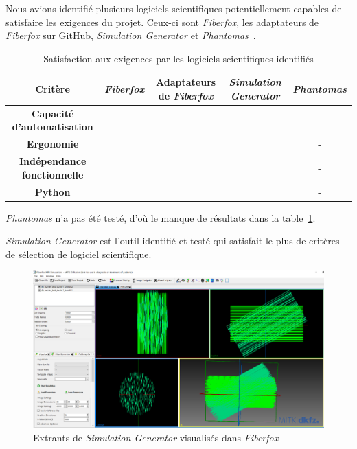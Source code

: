 \documentclass{article}
\newcommand{\cmark}{\ding{51}} %
\newcommand{\xmark}{\ding{55}} %
\begin{document}
  Nous avions identifié plusieurs logiciels scientifiques potentiellement capables de satisfaire les exigences du projet.
  Ceux-ci sont \textit{Fiberfox}, les adaptateurs de \textit{Fiberfox} sur GitHub, \textit{Simulation Generator} et \textit{Phantomas}~\cite{caruyer2014phantomas}.

  \begin{table}[H]

    \caption{Satisfaction aux exigences par les logiciels scientifiques identifiés}
    \centering

    \begin{tabular}{ |c| c c c c | }
      \toprule

      Critère
      & \textit{Fiberfox}
      & Adaptateurs de \textit{Fiberfox}
      & \textit{Simulation Generator}
      & \textit{Phantomas} \\

      \midrule

      \textbf{Capacité d'automatisation}  & \xmark & \cmark & \cmark & - \\
      \textbf{Ergonomie}                  & \xmark & \xmark & \cmark & - \\
      \textbf{Indépendance fonctionnelle} & \xmark & \xmark & \cmark & - \\
      \textbf{Python}                     & \xmark & \cmark & \cmark & - \\

      \bottomrule
    \end{tabular}
    \label{tab:tab1}

  \end{table}

  \textit{Phantomas} n'a pas été testé, d'où le manque de résultats dans la table~\ref{tab:tab1}.

  \textit{Simulation Generator} est l'outil identifié et testé qui satisfait le plus de critères de sélection de logiciel scientifique.

  \begin{figure}[H]
    \centering
    \includegraphics[width=\textwidth]{simulation_generator_results}
    \caption{Extrants de \textit{Simulation Generator} visualisés dans \textit{Fiberfox}}
    \label{fig:fig1}
  \end{figure}
\end{document}

